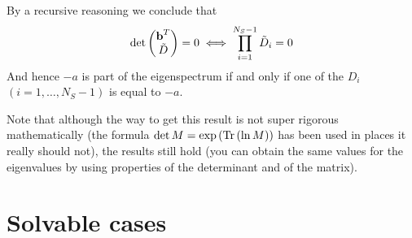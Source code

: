 \documentclass[12pt, titlepage]{report}
\begin{document}
	By a recursive reasoning we conclude that
	\begin{equation}
		\det
		\begin{pmatrix}
			\textbf{b}^T \\
			\tilde{D}
		\end{pmatrix}
		= 0 \iff \prod_{i=1}^{N_S-1} \tilde{D}_i =0
	\end{equation}
	And hence $-a$ is part of the eigenspectrum if and only if one of the $D_i$ $(i=1, \dots, N_S-1)$ is equal to $-a$.

	Note that although the way to get this result is not super rigorous mathematically (the formula $\det M = \exp\left(\operatorname{Tr}\left(\ln M\right)\right)$ has been used in places it really should not), the results still hold (you can obtain the same values for the eigenvalues by using properties of the determinant and of the matrix).

	\clearpage
	\section{Solvable cases}
\end{document}
